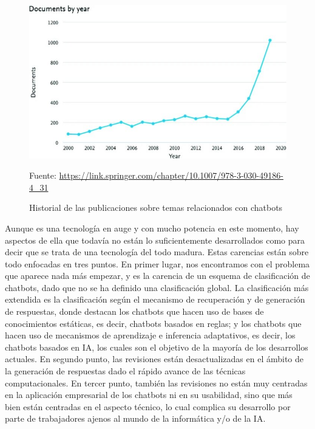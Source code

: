 \begin{figure}[h]
\centering
\includegraphics[width=1.0\textwidth]{imagenes/02_EstadoDelArte/publicaciones_chatbots.jpg}
\begin{center}
Fuente: \url{https://link.springer.com/chapter/10.1007/978-3-030-49186-4_31}
\end{center}
\caption{Historial de las publicaciones sobre temas relacionados con chatbots}
\label{fig:publicaciones_chatbot}
\end{figure}

Aunque es una tecnología en auge y con mucho potencia en este momento, hay aspectos de ella que todavía no están lo suficientemente desarrollados como para decir que se trata de una tecnología del todo madura. Estas carencias están sobre todo enfocadas en tres puntos.
En primer lugar, nos encontramos con el problema que aparece nada más empezar, y es la carencia de un esquema de clasificación de chatbots, dado que no se ha definido una clasificación global. La clasificación más extendida es la clasificación según el mecanismo de recuperación y de generación de respuestas, donde destacan los chatbots que hacen uso de bases de conocimientos estáticas, es decir, chatbots basados en reglas; y los chatbots que hacen uso de mecanismos de aprendizaje e inferencia adaptativos, es decir, los chatbots basados en \newline\gls{IA}, los cuales son el objetivo de la mayoría de los desarrollos actuales. En segundo punto, las revisiones están desactualizadas en el ámbito de la generación de respuestas dado el rápido avance de las técnicas computacionales. En tercer punto, también las revisiones no están muy centradas en la aplicación empresarial de los chatbots ni en su usabilidad, sino que más bien están centradas en el aspecto técnico, lo cual complica su desarrollo por parte de trabajadores ajenos al mundo de la informática y/o de la \gls{IA}.

